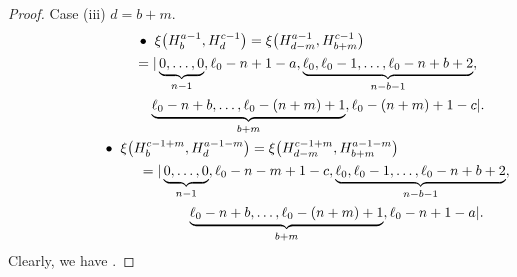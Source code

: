 \documentclass[pdftex]{sigma}
\numberwithin{equation}{section}
\begin{document}
\begin{proof}
Case (iii) $d=b+m$.
\begin{gather*}
\hspace{-3.85mm}\bullet\hspace{2mm}
\xi\bigl(H^{a-1}_{b}, H^{c-1}_{d}\bigr)=\xi\bigl(H^{a-1}_{d-m}, H^{c-1}_{b+m}\bigr)\\
\hphantom{\hspace{-3.85mm}\bullet\hspace{2mm}\xi\bigl(H^{a-1}_{b}, H^{c-1}_{d}\bigr)}{}
=|\underbrace{0,\dots,0}_{n-1},\ell_{0}-n+1-a,\underbrace{\ell_{0},\ell_{0}-1,\dots,\ell_{0}-n+b+2}_{n-b-1},\\
\hphantom{\hspace{-3.85mm}\bullet\hspace{2mm}\xi\bigl(H^{a-1}_{b}, H^{c-1}_{d}\bigr)=|}{}
\underbrace{\ell_{0}-n+b,\dots,\ell_{0}-(n+m)+1}_{b+m},\ell_{0}-(n+m)+1-c|.\\
\hspace{-3.85mm}\bullet\hspace{2mm}
\xi\bigl(H^{c-1+m}_{b}, H^{a-1-m}_{d}\bigr)=\xi\bigl(H^{c-1+m}_{d-m},H^{a-1-m}_{b+m}\bigr)\\
\hphantom{\hspace{-3.85mm}\bullet\hspace{2mm}\xi\bigl(H^{c-1+m}_{b}, H^{a-1-m}_{d}\bigr)}{}
=|\underbrace{0,\dots,0}_{n-1},\ell_{0}-n-m+1-c,\underbrace{\ell_{0},\ell_{0}-1,\dots,\ell_{0}-n+b+2}_{n-b-1},\\
\hphantom{\hspace{-3.85mm}\bullet\hspace{2mm}\xi\bigl(H^{c-1+m}_{b}, H^{a-1-m}_{d}\bigr)=|}{}
\underbrace{\ell_{0}-n+b,\dots,\ell_{0}-(n+m)+1}_{b+m},\ell_{0}-n+1-a|.
\end{gather*}
Clearly, we have .





\end{proof}
\end{document}
